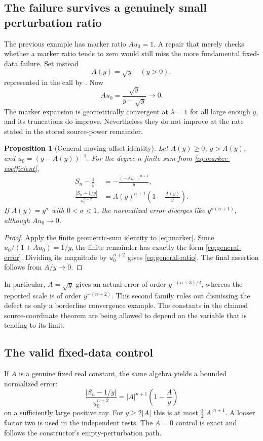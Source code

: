 \documentclass[11pt,a4paper]{article}
\newtheorem{proposition}[theorem]{Proposition}
\theoremstyle{remark}\newtheorem{remark}[theorem]{Remark}
\newcommand{\code}[1]{\texttt{\detokenize{#1}}}
\begin{document}
\subsection{The failure survives a genuinely small perturbation ratio}

The previous example has marker ratio $A u_0=1$. A repair that merely checks
whether a marker ratio tends to zero would still miss the more fundamental
fixed-data failure. Set instead
\[
 A(y)=\sqrt y\quad(y>0),
\]
represented in the call by \code{Sqrt[Abs[y]]}. Now
\[
 A u_0=\frac{\sqrt y}{y-\sqrt y}\longrightarrow0.
\]
The marker expansion is geometrically convergent at $\lambda=1$ for all large
enough $y$, and its truncations do improve. Nevertheless they do not improve at
the rate stated in the stored source-power remainder.

\begin{proposition}[General moving-offset identity]
Let $A(y)\geq0$, $y>A(y)$, and $u_0=(y-A(y))^{-1}$. For the degree-$n$ finite
sum from \cref{eq:marker-coefficient},
\begin{align}
 S_n-\frac1y&=-\frac{(-A u_0)^{n+1}}{y},\label{eq:general-error}\\
 \frac{|S_n-1/y|}{u_0^{n+2}}
 &= A(y)^{n+1}\left(1-\frac{A(y)}y\right).
 \label{eq:general-ratio}
\end{align}
If $A(y)=y^\sigma$ with $0<\sigma<1$, the normalized error diverges like
$y^{\sigma(n+1)}$, although $A u_0\to0$.
\end{proposition}
\begin{proof}
Apply the finite geometric-sum identity to \cref{eq:marker}. Since
$u_0/(1+A u_0)=1/y$, the finite remainder has exactly the form
\eqref{eq:general-error}. Dividing its magnitude by $u_0^{n+2}$ gives
\eqref{eq:general-ratio}. The final assertion follows from $A/y\to0$.
\end{proof}

In particular, $A=\sqrt y$ gives an actual error of order
$y^{-(n+3)/2}$, whereas the reported scale is of order $y^{-(n+2)}$.
This second family rules out dismissing the defect as only a borderline
convergence example. The constants in the claimed source-coordinate theorem
are being allowed to depend on the variable that is tending to its limit.

\subsection{The valid fixed-data control}

If $A$ is a genuine fixed real constant, the same algebra yields a bounded
normalized error:
\[
 \frac{|S_n-1/y|}{u_0^{n+2}}
 =|A|^{n+1}\left(1-\frac Ay\right)
\]
on a sufficiently large positive ray. For $y\geq2|A|$ this is at most
$\tfrac32|A|^{n+1}$. A looser factor two is used in the independent tests.
The $A=0$ control is exact and follows the constructor's empty-perturbation path.
\end{document}
